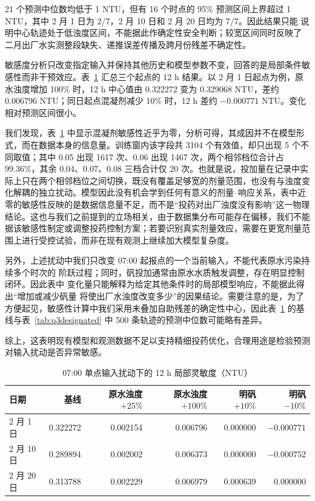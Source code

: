 \documentclass[UTF8,12pt,a4paper]{ctexart}
\begin{document}
21 个预测中位数均低于 1 NTU，但有 16 个时点的 95\% 预测区间上界超过
1 NTU，其中 2 月 1 日为 2/7，2 月 10 日和 2 月 20 日均为 7/7。因此结果只能
说明中心轨迹处于低浊度区间，不能据此作确定性安全判断；较宽区间同时反映了
二月出厂水实测整段缺失、递推误差传播及跨月份残差不确定性。

敏感度分析只改变指定输入并保持其他历史和模型参数不变，回答的是局部条件敏感性而非干预效应。表~\ref{tab:q3sensitivity12h} 汇总三个起点的 12 h 结果。以 2 月 1 日起点为例，原水浊度增加 100\% 时，12 h 中心值由 0.322272 变为 0.329068 NTU，差约 0.006796 NTU；同日起点混凝剂减少 10\% 时，12 h 差约 $-0.000771$ NTU。变化相对预测区间很小。

我们发现，表~\ref{tab:q3sensitivity12h} 中显示混凝剂敏感性近乎为零，分析可得，其成因并不在模型形式，而在数据本身的信息量。训练窗内该字段共 3104 个有效值，却只出现 5 个不同取值；其中 0.05 出现 1617 次、0.06 出现 1467 次，两个相邻档位合计占 99.36\%，其余 0.04、0.07、0.08 三档合计仅 20 次。也就是说，投加量在记录中实际上只在两个相邻档位之间切换，既没有覆盖足够宽的剂量范围，也没有与浊度变化解耦的独立扰动。模型因此没有机会学到任何有意义的剂量--响应关系，表中近零的敏感性反映的是数据信息量不足，而不是“投药对出厂浊度没有影响”这一物理结论。这也与我们之前提到的立场相关，由于数据集分布可能存在偏移，我们不能据该敏感性制定或调整投药控制方案；若要识别真实剂量效应，需要在更宽剂量范围上进行受控试验，而非在现有观测上继续加大模型复杂度。

另外，上述扰动中我们只改变 07:00 起报点的一个当前输入，不能代表原水污染持续多个时次的
阶跃过程；同时，矾投加通常由原水水质触发调整，存在明显控制闭环。因此表中
变化量只能解释为给定其他条件时的局部模型响应，不能据此得出“增加或减少矾量
将使出厂水浊度改变多少”的因果结论。需要注意的是，为了方便起见，敏感性计算中我们采用未叠加自助残差的确定性中心，因此表~\ref{tab:q3sensitivity12h} 的基线与表~\ref{tab:q3designated}
中 500 条轨迹的预测中位数可能略有差异。

综上，这表明现有模型和观测数据不足以支持精细投药优化，合理用途是检验预测对输入扰动是否异常敏感。



\begin{table}[htbp]
\centering
\small
\caption{07:00 单点输入扰动下的 12 h 局部灵敏度（NTU）}
\label{tab:q3sensitivity12h}
\begin{tabular}{lrrrrr}
\toprule
日期 & 基线 & 原水浊度 $+25\%$ & 原水浊度 $+100\%$ & 明矾 $+10\%$ & 明矾 $-10\%$\\
\midrule
2 月 1 日  & 0.322272 & 0.002154 & 0.006796 & 0.000000 & $-0.000771$\\
2 月 10 日 & 0.289894 & 0.002002 & 0.006373 & 0.000000 & $-0.000752$\\
2 月 20 日 & 0.313788 & 0.002229 & 0.006979 & 0.000639 & 0.000000\\
\bottomrule
\end{tabular}
\end{table}
\end{document}
